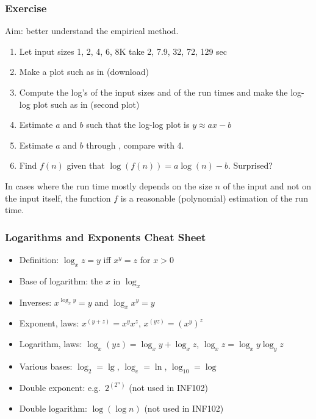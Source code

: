 \documentclass[handout]{beamer}
\newcommand{\git}{https://github.com/marcbezem/INF102/blob/master}
\begin{document}
\frame
  {
    
    \frametitle{Exercise}

Aim: better understand the empirical method.

\begin{enumerate}[<+->]

\item Let input sizes 1, 2, 4, 6, 8K take 2, 7.9, 32, 72,  129 sec
\item Make a plot such as in \href{\git/lecturenotes/plots_1_4.ods}%
{\color{red}{plot sheet}} (download)
\item Compute the log's of the input sizes and of the run times
and make the log-log plot such as in \href{\git/lecturenotes/plots_1_4.ods}%
{\color{red}{plot sheet}} (second plot)
\item Estimate $a$ and $b$ such that the log-log plot is $y \approx ax - b$
\item Estimate $a$ and $b$ through
\href{http://www.alcula.com/calculators/statistics/linear-regression/}{\color{red}{linear regression}}, compare with 4.
\item Find $f(n)$ given that $\log(f(n))= a\log(n) - b$. Surprised?
\end{enumerate}  
In cases where the run time mostly depends on the size $n$ of the input
and not on the input itself, the function $f$ is a reasonable 
(polynomial) estimation of the run time.
}

\begin{frame}

    \frametitle{Logarithms and Exponents Cheat Sheet}

\begin{itemize}[<+->]
\item Definition: $\log_x z = y$ iff $x^y = z$ for $x>0$
\item Base of logarithm: the $x$ in $\log_x$
\item Inverses: $x^{\log_x y} = y$ and $\log_x x^y = y$
\item Exponent, laws: $x^{(y+z)} = x^y x^z$, $x^{(yz)} = (x^y)^z$
\item Logarithm, laws: $\log_x (yz) = \log_x y + \log_x z$, $\log_x z = \log_x y \log_y z$
\item Various bases: $\log_2 = \lg$, $\log_e = \ln$, $\log_{10} = \log$
\item Double exponent: e.g.\ $2^{(2^n)}$ (not used in INF102)
\item Double logarithm: $\log(\log n)$ (not used in INF102)
\end{itemize}     

\end{frame}
\end{document}
